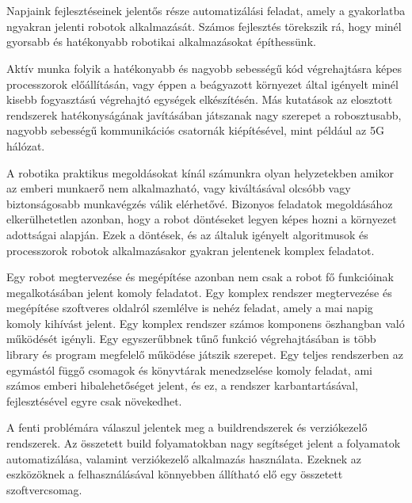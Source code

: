 \chapter{\bevezetes}

Napjaink fejlesztéseinek jelentős része automatizálási feladat, amely a
gyakorlatba ngyakran jelenti robotok alkalmazását. Számos fejlesztés törekszik
rá, hogy minél gyorsabb és hatékonyabb robotikai alkalmazásokat építhessünk.

Aktív munka folyik a hatékonyabb és nagyobb sebességű kód végrehajtásra képes
processzorok előállításán, vagy éppen a beágyazott környezet által igényelt
minél kisebb fogyasztású végrehajtó egységek elkészítésén. Más kutatások az
elosztott rendszerek hatékonyságának javításában játszanak nagy szerepet a
robosztusabb, nagyobb sebességű kommunikációs csatornák kiépítésével, mint
például az 5G hálózat.

\medskip

A robotika praktikus megoldásokat kínál számunkra olyan helyzetekben amikor az
emberi munkaerő nem alkalmazható, vagy kiváltásával olcsóbb vagy biztonságosabb
munkavégzés válik elérhetővé. Bizonyos feladatok megoldásához elkerülhetetlen
azonban, hogy a robot döntéseket legyen képes hozni a környezet adottságai
alapján. Ezek a döntések, és az általuk igényelt algoritmusok és processzorok
robotok alkalmazásakor gyakran jelentenek komplex feladatot.

Egy robot megtervezése és megépítése azonban nem csak a robot fő funkcióinak
megalkotásában jelent komoly feladatot. Egy komplex rendszer megtervezése és
megépítése szoftveres oldalról szemlélve is nehéz feladat, amely a mai napig
komoly kihívást jelent. Egy komplex rendszer számos komponens öszhangban való
működését igényli. Egy egyszerűbbnek tűnő funkció végrehajtásában is több
library és program megfelelő működése játszik szerepet. Egy teljes rendszerben az
egymástól függő csomagok és könyvtárak menedzselése komoly feladat, ami számos
emberi hibalehetőséget jelent, és ez, a rendszer karbantartásával, fejlesztésével
egyre csak növekedhet.

\medskip

A fenti problémára válaszul jelentek meg a buildrendszerek és verziókezelő
rendszerek. Az összetett build folyamatokban nagy segítséget jelent a folyamatok
automatizálása, valamint verziókezelő alkalmazás használata. Ezeknek az
eszközöknek a felhasználásával könnyebben állítható elő egy összetett
szoftvercsomag.

